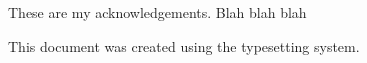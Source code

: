 These are my acknowledgements. Blah blah blah

\null\vfill
\noindent This document was created using the \latex typesetting system.
